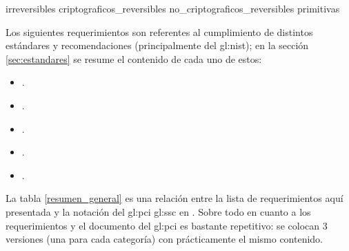 {irreversibles}
{criptograficos_reversibles}
{no_criptograficos_reversibles}
{primitivas}


Los siguientes requerimientos son referentes al cumplimiento
de distintos estándares y recomendaciones (principalmente del \gls{gl:nist});
en la sección \ref{sec:estandares} se resume el contenido de cada uno de
estos:

\begin{itemize}
  \item {}.
  \item {}.
  \item {}.
  \item {}.
  \item {}.
\end{itemize}

La tabla \ref{resumen_general} es una relación entre la lista de
requerimientos aquí presentada y la notación del \gls{gl:pci} \gls{gl:ssc} en
\cite{pci_tokens}. Sobre todo en cuanto a los requerimientos
 y
 el documento del \gls{gl:pci} es
bastante repetitivo: se colocan 3 versiones (una para cada categoría) con
prácticamente el mismo contenido.

